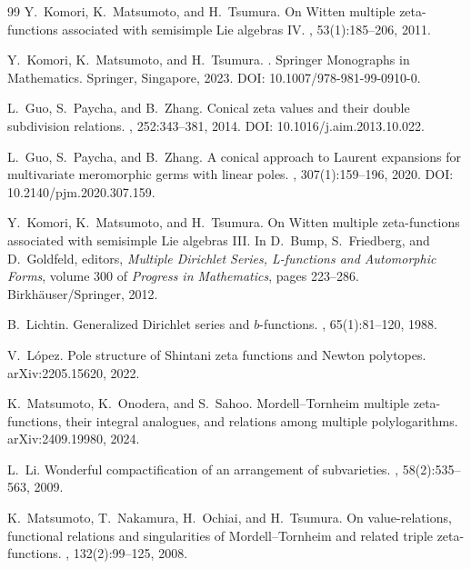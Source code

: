 \documentclass[11pt]{article}
\begin{document}
\begin{thebibliography}{99}
Y.~Komori, K.~Matsumoto, and H.~Tsumura.
\newblock On Witten multiple zeta-functions associated with semisimple Lie
  algebras {IV}.
, 53(1):185--206, 2011.


Y.~Komori, K.~Matsumoto, and H.~Tsumura.
.
\newblock Springer Monographs in Mathematics. Springer, Singapore, 2023.
\newblock DOI: 10.1007/978-981-99-0910-0.


L.~Guo, S.~Paycha, and B.~Zhang.
\newblock Conical zeta values and their double subdivision relations.
, 252:343--381, 2014.
\newblock DOI: 10.1016/j.aim.2013.10.022.

L.~Guo, S.~Paycha, and B.~Zhang.
\newblock A conical approach to Laurent expansions for multivariate
 meromorphic germs with linear poles.
, 307(1):159--196, 2020.
\newblock DOI: 10.2140/pjm.2020.307.159.

Y.~Komori, K.~Matsumoto, and H.~Tsumura.
\newblock On Witten multiple zeta-functions associated with semisimple Lie
 algebras {III}.
\newblock In D.~Bump, S.~Friedberg, and D.~Goldfeld, editors,
 {\em Multiple Dirichlet Series, L-functions and Automorphic Forms},
 volume 300 of {\em Progress in Mathematics}, pages 223--286.
 Birkh\"auser/Springer, 2012.

B.~Lichtin.
\newblock Generalized Dirichlet series and \(b\)-functions.
, 65(1):81--120, 1988.

V.~L\'opez.
\newblock Pole structure of Shintani zeta functions and Newton polytopes.
\newblock arXiv:2205.15620, 2022.

K.~Matsumoto, K.~Onodera, and S.~Sahoo.
\newblock Mordell--Tornheim multiple zeta-functions, their integral analogues,
 and relations among multiple polylogarithms.
\newblock arXiv:2409.19980, 2024.

L.~Li.
\newblock Wonderful compactification of an arrangement of subvarieties.
, 58(2):535--563, 2009.

K.~Matsumoto, T.~Nakamura, H.~Ochiai, and H.~Tsumura.
\newblock On value-relations, functional relations and singularities of
  Mordell--Tornheim and related triple zeta-functions.
, 132(2):99--125, 2008.




\end{thebibliography}
\end{document}
